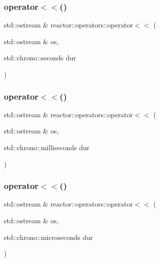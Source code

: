 \mbox{\label{namespacereactor_1_1operators_aac16dca80170efe903081b2b41cfda47}} 
\subsubsection{\texorpdfstring{operator$<$$<$()}{operator<<()}\hspace{0.1cm}{\footnotesize\ttfamily [2/5]}}
{\footnotesize\ttfamily std\+::ostream \& reactor\+::operators\+::operator$<$$<$ (\begin{DoxyParamCaption}\item[{std\+::ostream \&}]{os,  }\item[{std\+::chrono\+::seconds}]{dur }\end{DoxyParamCaption})}

\mbox{\label{namespacereactor_1_1operators_a7bc089730a721df6047cd010af2501d2}} 
\subsubsection{\texorpdfstring{operator$<$$<$()}{operator<<()}\hspace{0.1cm}{\footnotesize\ttfamily [3/5]}}
{\footnotesize\ttfamily std\+::ostream \& reactor\+::operators\+::operator$<$$<$ (\begin{DoxyParamCaption}\item[{std\+::ostream \&}]{os,  }\item[{std\+::chrono\+::milliseconds}]{dur }\end{DoxyParamCaption})}

\mbox{\label{namespacereactor_1_1operators_a279ac480746dbb8a6dcd71179df68032}} 
\subsubsection{\texorpdfstring{operator$<$$<$()}{operator<<()}\hspace{0.1cm}{\footnotesize\ttfamily [4/5]}}
{\footnotesize\ttfamily std\+::ostream \& reactor\+::operators\+::operator$<$$<$ (\begin{DoxyParamCaption}\item[{std\+::ostream \&}]{os,  }\item[{std\+::chrono\+::microseconds}]{dur }\end{DoxyParamCaption})}

